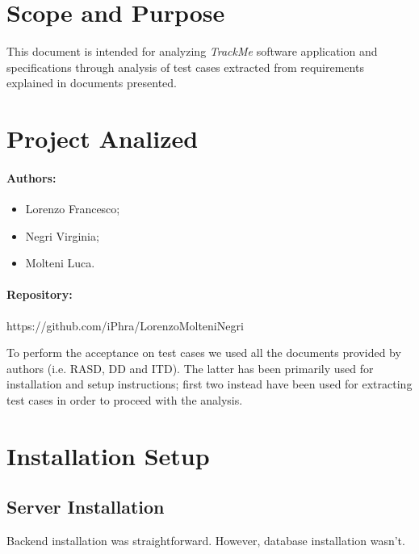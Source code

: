 \documentclass[a4paper]{article}
\begin{document}

\tableofcontents
{}

\newpage
\pagestyle{fancy}
\section{Scope and Purpose}
This document is intended for analyzing \textit{TrackMe} software application and specifications through analysis of test cases extracted from requirements explained in documents presented.

\section{Project Analized}
\paragraph{Authors:}
\begin{itemize}
    \item Lorenzo Francesco;
    \item Negri Virginia;
    \item Molteni Luca.
\end{itemize}
\paragraph{Repository:}
https://github.com/iPhra/LorenzoMolteniNegri \newline

To perform the acceptance on test cases we used all the documents provided by authors (i.e. RASD, DD and ITD). The latter has been primarily used for installation and setup instructions; first two instead have been used for extracting test cases in order to proceed with the analysis.

\newpage
\section{Installation Setup}
\subsection{Server Installation}
Backend installation was straightforward. However, database installation wasn't.
\end{document}
